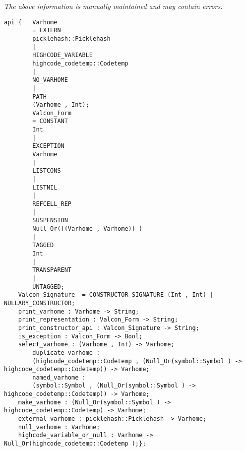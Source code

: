 \label{api:Varhome}

{\tiny \it The above information is manually maintained and may contain errors.}
\begin{verbatim}
api {   Varhome
        = EXTERN
        picklehash::Picklehash
        |
        HIGHCODE_VARIABLE
        highcode_codetemp::Codetemp
        |
        NO_VARHOME
        |
        PATH
        (Varhome , Int);
        Valcon_Form
        = CONSTANT
        Int
        |
        EXCEPTION
        Varhome
        |
        LISTCONS
        |
        LISTNIL
        |
        REFCELL_REP
        |
        SUSPENSION
        Null_Or(((Varhome , Varhome)) )
        |
        TAGGED
        Int
        |
        TRANSPARENT
        |
        UNTAGGED;
    Valcon_Signature  = CONSTRUCTOR_SIGNATURE (Int , Int) | NULLARY_CONSTRUCTOR;
    print_varhome : Varhome -> String;
    print_representation : Valcon_Form -> String;
    print_constructor_api : Valcon_Signature -> String;
    is_exception : Valcon_Form -> Bool;
    select_varhome : (Varhome , Int) -> Varhome;
        duplicate_varhome :
        (highcode_codetemp::Codetemp , (Null_Or(symbol::Symbol ) -> highcode_codetemp::Codetemp)) -> Varhome;
        named_varhome :
        (symbol::Symbol , (Null_Or(symbol::Symbol ) -> highcode_codetemp::Codetemp)) -> Varhome;
    make_varhome : (Null_Or(symbol::Symbol ) -> highcode_codetemp::Codetemp) -> Varhome;
    external_varhome : picklehash::Picklehash -> Varhome;
    null_varhome : Varhome;
    highcode_variable_or_null : Varhome -> Null_Or(highcode_codetemp::Codetemp );};
\end{verbatim}
